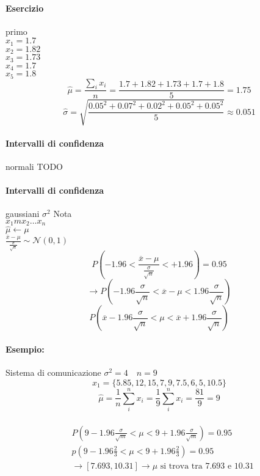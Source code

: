 \documentclass[]{article}
\begin{document}
    \paragraph{Esercizio} primo \\
    $x_1 = 1.7$ \\
    $x_2 = 1.82$ \\
    $x_3 = 1.73$\\
    $x_4 = 1.7$\\
    $x_5 = 1.8$ \\
    \[ \hat{\mu} = \frac{\sum_{i}^{} x_i}{n} = \frac{1.7 + 1.82 + 1.73 + 1.7 + 1.8}{5} = 1.75 \]
    \[ \hat{\sigma} = \sqrt{\frac{0.05^2 + 0.07^2 + 0.02^2 + 0.05^2 + 0.05^2}{5}} \approx 0.051 \]
    \paragraph{Intervalli di confidenza} normali
    TODO
    \paragraph{Intervalli di confidenza} gaussiani
    $\sigma^2$ Nota \\
    $x_1m x_2 \ldots x_n$ \\
    $\hat{\mu} \longleftarrow \mu$ \\
    $\frac{\overline{x} - \mu}{\frac{\sigma}{\sqrt{n}}} \sim \mathcal{N}(0,1)$ \\
    \[ P(-1.96 < \frac{\overline{x} - \mu}{\frac{\sigma}{\sqrt{n}}} < +1.96) = 0.95 \]
    \[ \longrightarrow P(-1.96 \frac{\sigma}{\sqrt{n}} < \overline{x} - \mu < 1.96 \frac{\sigma}{\sqrt{n}}) \]
    \[ P(\overline{x} - 1.96 \frac{\sigma}{\sqrt{n}} < \mu < \overline{x} + 1.96 \frac{\sigma}{\sqrt{n}}) \]
    \paragraph{Esempio:} Sistema di comunicazione
    $\sigma^2 = 4 \quad n = 9$
    \[ x_1 = \{ 5.85, 12, 15, 7, 9, 7.5, 6, 5, 10.5 \} \]
    \[ \hat{\mu} = \frac{1}{n} \sum_{i}^{n} x_i = \frac{1}{9} \sum_{i}^{n} x_i = \frac{81}{9} = 9 \] \\
    \begin{equation*}
        \begin{aligned}
            & P\left(9-1.96 \frac{\sigma}{\sqrt{m}}<\mu<9+1.96 \frac{\sigma}{\sqrt{m}}\right)=0.95 \\
            & p\left(9-1.96 \frac{2}{3}<\mu<9+1.96 \frac{2}{3}\right)=0.95 \\
            & \longrightarrow[7.693,10.31] \rightarrow \mu \text { si trova tra 7.693 e 10.31} \\
        \end{aligned}
    \end{equation*}
\end{document}
